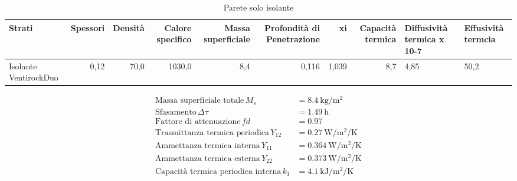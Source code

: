 \begin{table}
\centering
\caption{Parete solo isolante}
\begin{tabular}{lrrrrrrr}
\toprule
                 Strati & Spessori & Densità & Calore specifico & Massa superficiale & Profondità di Penetrazione &     xi & Capacità termica & Diffusività termica x 10-7 & Effusività termcia \\
\midrule
 Isolante VentirockDuo  &     0,12 &    70,0 &           1030,0 &                8,4 &                      0,116 &  1,039 &              8,7 &                       4,85 &               50,2 \\
\bottomrule
\end{tabular}
\end{table}

\begin{flushleft}
\begin{align*}
\text{Massa superficiale totale} \, M_s &= \SI{8.4}{\kilo\gram\per\metre\squared}\\
\text{Sfasamento} \, \Delta\tau &= \SI{1.49}{\hour}\\
\text{Fattore di attenuazione} \, fd &= \SI{0.97}{}\\
\text{Trasmittanza termica periodica} \, Y_{12} &= \SI{0.27}{\watt\per\metre\squared\per\kelvin}\\
\text{Ammettanza termica interna} \, Y_{11} &= \SI{0.364}{\watt\per\metre\squared\per\kelvin}\\
\text{Ammettanza termica esterna} \, Y_{22} &= \SI{0.373}{\watt\per\metre\squared\per\kelvin}\\
\text{Capacità termica periodica interna} \, k_1 &= \SI{4.1}{\kilo\joule\per\metre\squared\per\kelvin}\\
\end{align*}
\end{flushleft}
